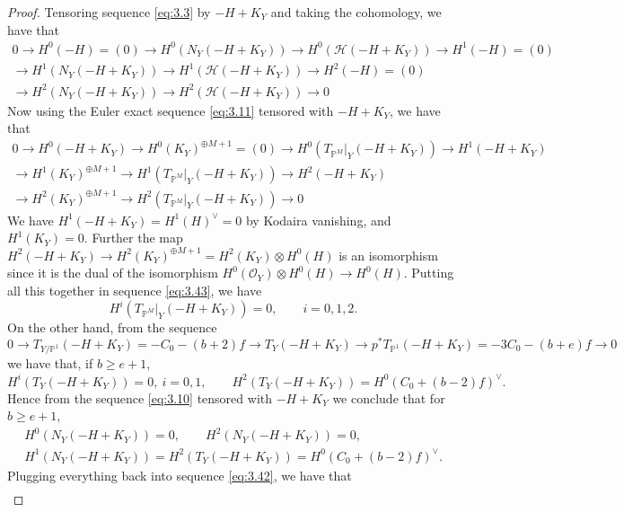 \documentclass[11pt,reqno]{amsart}
\theoremstyle{plain}
\theoremstyle{definition}
\newcommand{\PP}{\mathbb{P}}
\newcommand{\PM}{\mathbb{P}^M}
\newcommand{\OO}{\mathcal{O}}
\newcommand{\NY}{N_{Y}}
\newcommand{\Hc}{\mathcal{H}}
\newcommand{\TP}{T_{\PM}|_Y}
\begin{document}
\begin{proof}
Tensoring sequence \eqref{eq:3.3} by $-H+K_Y$ and taking the cohomology, we have that
\begin{multline}\label{eq:3.42}
0\to H^0(-H)=(0)\to H^0(\NY(-H+K_Y))\to H^0(\Hc(-H+K_Y))\to H^1(-H)=(0)\\
\to H^1(\NY(-H+K_Y))\to H^1(\Hc(-H+K_Y))\to H^2(-H)=(0)\\
\to H^2(\NY(-H+K_Y))\to H^2(\Hc(-H+K_Y))\to 0
\end{multline}
Now using the Euler exact sequence \eqref{eq:3.11} tensored with $-H+K_Y$, we have that
\begin{multline}\label{eq:3.43}
0\to H^0(-H+K_Y)\to H^0(K_Y)^{\oplus M+1}=(0)\to H^0(\TP(-H+K_Y))\to H^1(-H+K_Y)\\
\to H^1(K_Y)^{\oplus M+1}\to H^1(\TP(-H+K_Y))\to H^2(-H+K_Y)\\
\to H^2(K_Y)^{\oplus M+1}\to H^2(\TP(-H+K_Y))\to 0
\end{multline}
We have $H^1(-H+K_Y)=H^1(H)^{\vee}=0$ by Kodaira vanishing, and $H^1(K_Y)=0$. Further the map $H^2(-H+K_Y)\to H^2(K_Y)^{\oplus M+1}=H^2(K_Y)\otimes H^0(H)$ is an isomorphism since it is the dual of the isomorphism $H^0(\OO_Y)\otimes H^0(H)\to H^0(H)$. Putting all this together in sequence \eqref{eq:3.43}, we have
\begin{equation}\label{eq:3.44}
H^i(\TP(-H+K_Y))=0,\qquad i=0,1,2 .
\end{equation}
On the other hand, from the sequence
\begin{equation}\label{eq:3.45}
0\to T_{Y/\PP^1}(-H+K_Y)=-C_0-(b+2)f\to T_Y(-H+K_Y)\to p^*T_{\PP^1}(-H+K_Y)=-3C_0-(b+e)f\to 0
\end{equation}
we have that, if $b\ge e+1$,
\begin{equation}\label{eq:3.46}
H^i(T_Y(-H+K_Y))=0,\ i=0,1,\qquad H^2(T_Y(-H+K_Y))=H^0(C_0+(b-2)f)^{\vee}.
\end{equation}
Hence from the sequence \eqref{eq:3.10} tensored with $-H+K_Y$ we conclude that for $b\ge e+1$,
\begin{equation}\label{eq:3.47}
\begin{gathered}
H^0(\NY(-H+K_Y))=0,\qquad H^2(\NY(-H+K_Y))=0,\\
H^1(\NY(-H+K_Y))=H^2(T_Y(-H+K_Y))=H^0(C_0+(b-2)f)^{\vee}.
\end{gathered}
\end{equation}
Plugging everything back into sequence \eqref{eq:3.42}, we have that
\begin{equation}\label{eq:3.48}
\begin{gathered}

\end{gathered}
\end{equation}
\end{proof}
\end{document}
